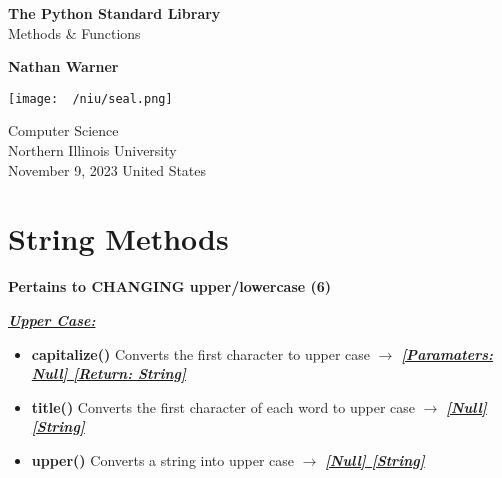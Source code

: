\documentclass{report}
\title{\Huge{}}
\author{\huge{Nathan Warner}}
\date{\huge{}}
\begin{document}
        \begin{titlepage}
       \begin{center}
           \vspace*{1cm}
    
           \textbf{The Python Standard Library} \\
           Methods \& Functions
    
           \vspace{0.5cm}
            
                
           \vspace{1.5cm}
    
           \textbf{Nathan Warner}
    
           \vfill
                
                
           \vspace{0.8cm}
         
           \texttt{[image: ~/niu/seal.png]}
                
           Computer Science \\
           Northern Illinois University\\
           November 9, 2023
           United States\\
           
                
       \end{center}
    \end{titlepage}
    \tableofcontents
    \pagebreak \bigbreak \noindent
    \section{\LARGE String Methods}
    \bigbreak \noindent 
    
      \begin{center}
        \textbf{Pertains to CHANGING upper/lowercase (6)}
      \end{center}
      \bigbreak \noindent 
      \textbf{\textit{\underline{Upper Case:}}}
      \begin{itemize}
        \item[\ding{43}] \textbf{capitalize()}	Converts the first character to upper case $\longrightarrow$ \textbf{\textit{\underline{[Paramaters: Null] [Return: String]}}}
        \item[\ding{43}] \textbf{title()}		Converts the first character of each word to upper case $\longrightarrow$ \textbf{\textit{\underline{[Null] [String]}}}
        \item[\ding{43}] \textbf{upper()}	Converts a string into upper case $\longrightarrow$ \textbf{\textit{\underline{[Null] [String]}}}
      \end{itemize}
\end{document}
